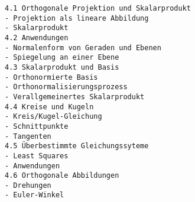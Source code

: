 \begin{verbatim}
4.1 Orthogonale Projektion und Skalarprodukt
- Projektion als lineare Abbildung
- Skalarprodukt
4.2 Anwendungen
- Normalenform von Geraden und Ebenen
- Spiegelung an einer Ebene
4.3 Skalarprodukt und Basis
- Orthonormierte Basis
- Orthonormalisierungsprozess
- Verallgemeinertes Skalarprodukt
4.4 Kreise und Kugeln
- Kreis/Kugel-Gleichung
- Schnittpunkte
- Tangenten
4.5 Überbestimmte Gleichungssyteme
- Least Squares
- Anwendungen
4.6 Orthogonale Abbildungen
- Drehungen
- Euler-Winkel
\end{verbatim}
